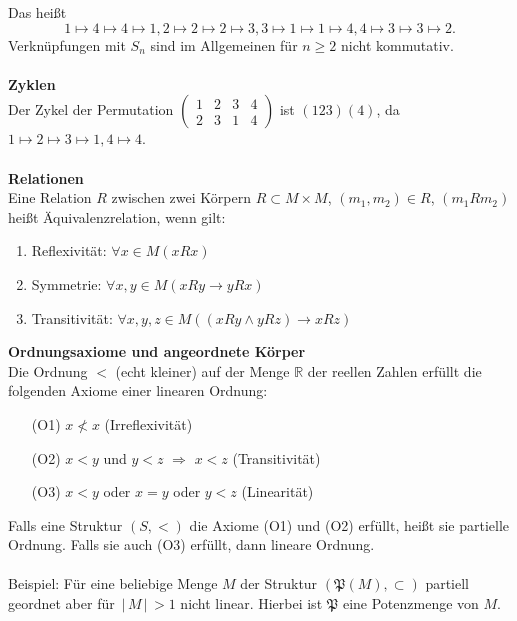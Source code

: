 \documentclass[a4paper,12pt]{article}
\begin{document}
Das heißt
\[ 
1\mapsto4\mapsto4\mapsto1,2\mapsto2\mapsto2\mapsto3,3\mapsto1\mapsto1\mapsto4,4\mapsto3\mapsto3\mapsto2
.\] 
Verknüpfungen mit $S_{n}$ sind im Allgemeinen für $n\geq 2$ nicht kommutativ.
\\\hfill\\\textbf{Zyklen}\\
Der Zykel der Permutation 
$\left( \begin{matrix}
        1&2&3&4\\
        2&3&1&4
\end{matrix}\right) $
ist $\left( 123\right) \left( 4\right)  $, da $1\mapsto2\mapsto3\mapsto1,4\mapsto4$.
\\\hfill\\\textbf{Relationen}\\
Eine Relation $R$ zwischen zwei Körpern $R\subset M\times M$, $\left( m_1,m_2\right)  \in R$, $\left( m_1Rm_2\right) $ heißt Äquivalenzrelation, wenn gilt:
\begin{enumerate}[wide,label=(\alph*)]
        \item Reflexivität: $\forall x \in M\left( xRx\right) $ 
        \item Symmetrie: $\forall x,y \in M\left( xRy\rightarrow yRx\right) $ 
        \item Transitivität: $\forall x,y,z \in M\left( \left( xRy\land yRz\right) \rightarrow xRz\right) $ 
\end{enumerate}
\textbf{Ordnungsaxiome und angeordnete Körper}\\
Die Ordnung $<$ (echt kleiner) auf der Menge $\mathbb{R}$ der reellen Zahlen erfüllt die folgenden Axiome einer linearen Ordnung:
\begin{enumerate}[wide,label=]
        \item[(O1)] $x\nless x$ (Irreflexivität) 
        \item[(O2)] $x<y$ und $y<z$ $\Rightarrow $ $x<z$ (Transitivität)
        \item[(O3)] $x<y$ oder $x=y$ oder $y<z$ (Linearität)
\end{enumerate}
Falls eine Struktur $\left( S,<\right) $ die Axiome (O1) und (O2) erfüllt, heißt sie partielle Ordnung. Falls sie auch (O3) erfüllt, dann lineare Ordnung.\\\\
Beispiel: Für eine beliebige Menge $M$ der Struktur $\left( \mathfrak{P}\left( M\right) ,\subset \right) $ partiell geordnet aber für $\,|\, M\,|\, >1$ nicht linear. Hierbei ist $\mathfrak{P}$ eine Potenzmenge von $M$.\\\\
\end{document}
